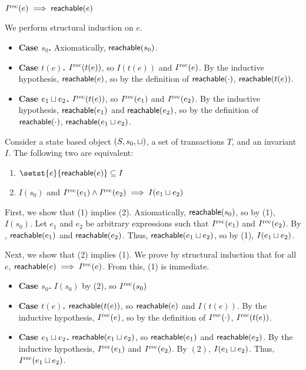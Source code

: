 \begin{claim}
  $I^{\text{rec}}(e) \implies \textsf{reachable}(e)$
\end{claim}
\begin{elidableproof}
  We perform structural induction on $e$.
  \begin{itemize}
    \item \textbf{Case $s_0$.}
      Axiomatically, $\textsf{reachable}(s_0)$.

    \item \textbf{Case $t(e)$.}
      $I^{\text{rec}}(t(e))$, so $I(t(e))$ and $I^{\text{rec}}(e)$. By the inductive hypothesis,
      $\textsf{reachable}(e)$, so by the definition of $\textsf{reachable}(\cdot)$,
      $\textsf{reachable}(t(e))$.

    \item \textbf{Case $e_1 \sqcup e_2$.}
      $I^{\text{rec}}(t(e))$, so $I^{\text{rec}}(e_1)$ and $I^{\text{rec}}(e_2)$. By the inductive
      hypothesis, $\textsf{reachable}(e_1)$ and $\textsf{reachable}(e_2)$, so by the definition
      of $\textsf{reachable}(\cdot)$, $\textsf{reachable}(e_1 \sqcup e_2)$.
  \end{itemize}
\end{elidableproof}

\begin{claim}
  Consider a state based object $(S, s_0, \sqcup)$, a set of transactions $T$,
  and an invariant $I$. The following two are equivalent:
  \begin{enumerate}[\quad(1)]
    \item
      $\setst{e}{\reachable{e}} \subseteq I$

    \item
      $I(s_0)$ and $I^{\text{rec}}(e_1) \land I^{\text{rec}}(e_2) \implies I(e_1 \sqcup e_2)$
  \end{enumerate}
\end{claim}
\begin{elidableproof}
  First, we show that (1) implies (2). Axiomatically, $\textsf{reachable}(s_0)$, so by
  (1), $I(s_0)$. Let $e_1$ and $e_2$ be arbitrary expressions such that
  $I^{\text{rec}}(e_1)$ and $I^{\text{rec}}(e_2)$. By ,
  $\textsf{reachable}(e_1)$ and $\textsf{reachable}(e_2)$. Thus, $\textsf{reachable}(e_1 \sqcup e_2)$,
  so by (1), $I(e_1 \sqcup e_2)$.

  Next, we show that (2) implies (1). We prove by structural induction that for
  all $e$, $\textsf{reachable}(e) \implies I^{\text{rec}}(e)$. From this, (1) is immediate.
  \begin{itemize}
    \item \textbf{Case $s_0$.}
      $I(s_0)$ by (2), so $I^{\text{rec}}(s_0)$

    \item \textbf{Case $t(e)$.}
      $\textsf{reachable}(t(e))$, so $\textsf{reachable}(e)$ and $I(t(e))$. By the inductive
      hypothesis, $I^{\text{rec}}(e)$, so by the definition of $I^{\text{rec}}(\cdot)$,
      $I^{\text{rec}}(t(e))$.

    \item \textbf{Case $e_1 \sqcup e_2$.}
      $\textsf{reachable}(e_1 \sqcup e_2)$, so $\textsf{reachable}(e_1)$ and $\textsf{reachable}(e_2)$.
      By the inductive hypothesis, $I^{\text{rec}}(e_1)$ and $I^{\text{rec}}(e_2)$. By $(2)$,
      $I(e_1 \sqcup e_2)$. Thus, $I^{\text{rec}}(e_1 \sqcup e_2)$.
  \end{itemize}
\end{elidableproof}

